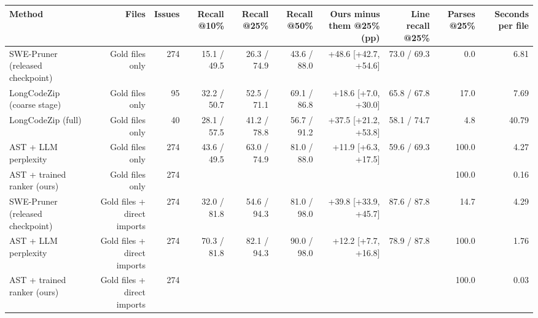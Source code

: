 \begin{tabular}{lrrrrrrrrr}
\toprule
Method & Files & Issues & Recall @10\% & Recall @25\% & Recall @50\% & Ours minus them @25\% (pp) & Line recall @25\% & Parses @25\% & Seconds per file \\
\midrule
SWE-Pruner (released checkpoint) & Gold files only & 274 & 15.1 / 49.5 & 26.3 / 74.9 & 43.6 / 88.0 & +48.6 [+42.7, +54.6] & 73.0 / 69.3 & 0.0 & 6.81 \\
LongCodeZip (coarse stage) & Gold files only & 95 & 32.2 / 50.7 & 52.5 / 71.1 & 69.1 / 86.8 & +18.6 [+7.0, +30.0] & 65.8 / 67.8 & 17.0 & 7.69 \\
LongCodeZip (full) & Gold files only & 40 & 28.1 / 57.5 & 41.2 / 78.8 & 56.7 / 91.2 & +37.5 [+21.2, +53.8] & 58.1 / 74.7 & 4.8 & 40.79 \\
AST + LLM perplexity & Gold files only & 274 & 43.6 / 49.5 & 63.0 / 74.9 & 81.0 / 88.0 & +11.9 [+6.3, +17.5] & 59.6 / 69.3 & 100.0 & 4.27 \\
AST + trained ranker (ours) & Gold files only & 274 &  &  &  &  &  & 100.0 & 0.16 \\
SWE-Pruner (released checkpoint) & Gold files + direct imports & 274 & 32.0 / 81.8 & 54.6 / 94.3 & 81.0 / 98.0 & +39.8 [+33.9, +45.7] & 87.6 / 87.8 & 14.7 & 4.29 \\
AST + LLM perplexity & Gold files + direct imports & 274 & 70.3 / 81.8 & 82.1 / 94.3 & 90.0 / 98.0 & +12.2 [+7.7, +16.8] & 78.9 / 87.8 & 100.0 & 1.76 \\
AST + trained ranker (ours) & Gold files + direct imports & 274 &  &  &  &  &  & 100.0 & 0.03 \\
\bottomrule
\end{tabular}

